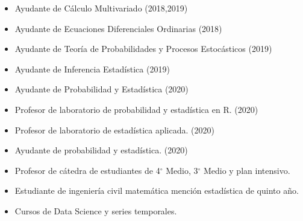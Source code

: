 \documentclass[10pt,letterpaper,ragged2e]{altacv}
\begin{document}
\begin{paracol}{2}


\begin{itemize}
\item Ayudante de Cálculo Multivariado (2018,2019)
\item Ayudante de Ecuaciones Diferenciales Ordinarias (2018)
\item Ayudante de Teoría de Probabilidades y Procesos Estocásticos (2019)
\item Ayudante de Inferencia Estadística (2019)
\item Ayudante de Probabilidad y Estadística (2020)
\end{itemize}
\divider
{}
\begin{itemize}
\item Profesor de laboratorio de probabilidad y estadística en R. (2020)
\item Profesor de laboratorio de estadística aplicada. (2020)
\item Ayudante de probabilidad y estadística. (2020)
\end{itemize}
\divider
{}
\begin{itemize}
\item Profesor de cátedra de estudiantes de 4$^\circ$ Medio, 3$^\circ$ Medio y plan intensivo.
\end{itemize}






\begin{itemize}
\item Estudiante de ingeniería civil matemática mención estadística de quinto año.
\end{itemize}
\divider

\begin{itemize}
\item Cursos de Data Science y series temporales.
\end{itemize}
\divider
\switchcolumn


\end{paracol}
\end{document}
